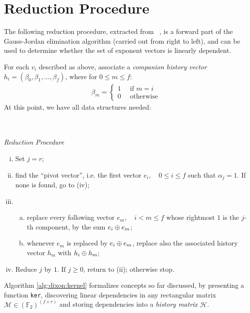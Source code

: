 \section{Reduction Procedure}

The following reduction procedure, extracted from ~\cite{morrison-brillhart}, is
a forward part of the Gauss-Jordan elimination algorithm (carried out from right
to left), and can be used to determine whether the set of exponent vectors is
linearly dependent.

For each $v_i$ described as above, associate a \emph{companion history vector}
$h_i = (\beta_0, \beta_1, \ldots, \beta_f)$, where for $0 \leq m \leq f$:
\begin{align*}
  \beta_m = \begin{cases}
    1 \quad \text{ if $m = i$} \\
    0 \quad \text{ otherwise}
    \end{cases}
\end{align*}
At this point, we have all data structures needed:
\\
\\
\\


\begin{center}
  \emph{Reduction Procedure}
\end{center}
\begin{enumerate}[(i)]
  \item Set $j=r$;
  \item find the ``pivot vector'', i.e. the first vector
    $e_i, \quad 0 \leq i \leq f$ such that $\alpha_j = 1$. If none is found, go
    to (iv);
  \item
    \begin{enumerate}[(a)]
      \item replace every following vector $e_m, \quad i < m \leq f$
        whose rightmost $1$ is the $j$-th component, by the sum $e_i \oplus e_m$;
      \item whenever $e_m$ is replaced by $e_i \oplus e_m$, replace also the
        associated history vector $h_m$ with $h_i \oplus h_m$;
    \end{enumerate}
  \item Reduce $j$ by $1$. If $j \geq 0$, return to (ii); otherwise stop.
\end{enumerate}

Algorithm \ref{alg:dixon:kernel} formalizes concepts so far discussed, by
presenting a function \texttt{ker}, discovering linear dependencies in any
rectangular matrix $\mathcal{M} \in (\mathbb{F}_2)^{(f \times r)}$
and storing dependencies into a \emph{history matrix} $\mathcal{H}$.


